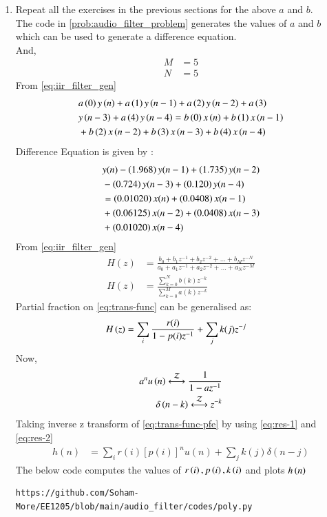 \documentclass[journal,12pt,twocolumn]{IEEEtran}
\theoremstyle{remark}
\begin{document}
\begin{enumerate}[label=\thesection.\arabic*]
\item Repeat all the exercises in the previous sections for the above $a$ and $b$.\\
\solution The code in \ref{prob:audio_filter_problem} generates the values of $a$ and $b$  which can be used to generate a difference equation.\\
And,
\begin{align}
    M &= 5\\
    N&=5
\end{align}
From \ref{eq:iir_filter_gen} 
\begin{align}
    &a\left(0\right)y\left(n\right) + a\left(1\right)y\left(n-1\right)+a\left(2\right)y\left(n-2\right)+a\left(3\right)\\ \notag &y\left(n-3\right) + a\left(4\right)y\left(n-4\right) =   b\left(0\right)x\left(n\right) + b\left(1\right)x\left(n-1\right)\\ \notag &+b\left(2\right)x\left(n-2\right)+b\left(3\right)x\left(n-3\right) + b\left(4\right)x\left(n-4\right) 
\end{align}
Difference Equation is given by :
\begin{align}
	&y(n) - \left(1.968\right)y(n - 1) + \left(1.735\right)y(n - 2) \nonumber \\
	&- \left(0.724\right)y(n - 3) + \left(0.120\right)y(n - 4) \nonumber \\
	&= \left(0.01020\right)x(n) + \left(0.0408\right)x(n - 1) \nonumber \\
	&+ \left(0.06125\right)x(n - 2) + \left(0.0408\right)x(n - 3) \nonumber \\
	&+ \left(0.01020\right)x(n - 4)
\end{align}
From \eqref{eq:iir_filter_gen} 
\begin{align}
    H(z) &= \frac{b_0 + b_1 z^{-1} + b_2 z^{-2} + \ldots + b_M z^{-N}}{a_0 + a_1 z^{-1} + a_2 z^{-2} + \ldots + a_N z^{-M}}\\
    H(z) &= \frac{\sum_{k = 0}^{N}b(k)z^{-k}}{\sum_{k = 0}^{M}a(k)z^{-k}} \label{eq:trans-func}
\end{align}
Partial fraction on \eqref{eq:trans-func} can be generalised as:
\begin{align}
    H\left(z\right)&= \sum_{i}\frac{r(i)}{1 - p(i)z^{-1}} + \sum_{j}k(j)z^{-j}
	\label{eq:trans-func-pfe}
\end{align}
Now,
\begin{align}
    a^{n}u\brak{n} \system{Z} \frac{1}{1-az^{-1}} \label{eq:res-1}\\
    \delta\brak{n-k} \system{Z} z^{-k}\label{eq:res-2}
\end{align}
Taking inverse z transform of \eqref{eq:trans-func-pfe} by using \eqref{eq:res-1} and \eqref{eq:res-2}
\begin{align}
h(n) &= \sum_{i}r(i)[p(i)]^nu(n) + \sum_{j}k(j)\delta(n - j)
	\label{eq:h-n-expr}
\end{align}
The below code computes the values of $r\left(i\right),p\left(i\right) , k\left(i\right)$ and plots $h\left(n\right)$
\begin{lstlisting}
https://github.com/Soham-More/EE1205/blob/main/audio_filter/codes/poly.py
\end{lstlisting}



\end{enumerate}
\end{document}
